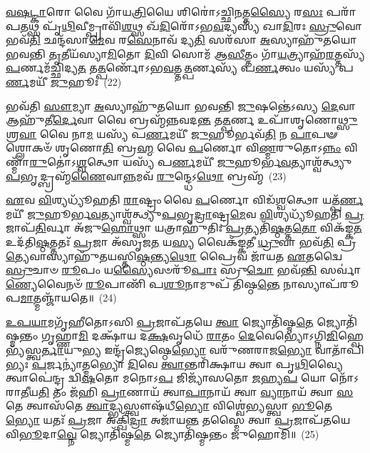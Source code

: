 \-\ul{𑌵}\-\-\ul{𑌷}\-\-\ul{𑌟𑍍𑌕𑌾}\-𑌰𑍋 𑌵𑍈 𑌗𑌾᳴𑌯\-\ul{𑌤𑍍𑌰𑌿}\-𑌯𑍈 𑌶𑌿𑌰𑍋॑\-𑌽𑌚𑍍𑌛𑌿\-\ul{𑌨}\-𑌤𑍍𑌤\-\ul{𑌸𑍍𑌯𑍈} 𑌰\-\ul{𑌸𑌃} 𑌪𑌰𑌾᳴𑌪\-\ul{𑌤}\-𑌥𑍍𑌸 𑌪𑍃᳴\-\ul{𑌥𑌿}\-𑌵𑍀𑌮𑍍𑌪𑍍𑌰𑌾𑌵𑌿᳴\-\ul{𑌶}\-𑌥𑍍𑌸 𑌖᳴\-\ul{𑌦𑌿}\-𑌰𑍋᳴\-𑌽𑌭\-\ul{𑌵}\-𑌦𑍍𑌯𑌸𑍍𑌯᳴ 𑌖𑌾\-\ul{𑌦𑌿}\-𑌰𑌃 \ul{𑌸𑍍𑌰𑍁}\-𑌵𑍋 𑌭𑌵᳴\-\ul{𑌤𑌿} 𑌛𑌨𑍍𑌦᳴𑌸𑌾\-\ul{𑌮𑍇}\-𑌵 𑌰\-\ul{𑌸𑍇}\-𑌨𑌾𑌵᳴ 𑌦𑍍𑌯\-\ul{𑌤𑌿} 𑌸𑌰᳴𑌸𑌾 \ul{𑌅}\-𑌸𑍍𑌯𑌾𑌹𑍁᳴𑌤𑌯𑍋 𑌭𑌵𑌨𑍍𑌤𑌿 \ul{𑌤𑍃}\-𑌤𑍀𑌯᳴𑌸𑍍𑌯𑌾\-\ul{𑌮𑌿}\-𑌤𑍋 \ul{𑌦𑌿}\-𑌵𑌿 𑌸𑍋𑌮᳴ 𑌆\-\ul{𑌸𑍀}\-𑌤𑍍𑌤𑌂 𑌗𑌾᳴\-\ul{𑌯}\-𑌤𑍍𑌰𑍍𑌯𑌾𑌹᳴\-\ul{𑌰}\-𑌤𑍍𑌤𑌸𑍍𑌯᳴ \ul{𑌪}\-𑌰𑍍𑌣𑌮᳴𑌚𑍍𑌛𑌿𑌦𑍍𑌯\-\ul{𑌤} 𑌤\-\ul{𑌤𑍍𑌪}\-𑌰𑍍𑌣𑍋᳴\-𑌽𑌭\-\ul{𑌵}\-𑌤𑍍𑌤\-\ul{𑌤𑍍𑌪}\-𑌰𑍍𑌣𑌸𑍍𑌯᳴ 𑌪\-\ul{𑌰𑍍𑌣}\-𑌤𑍍𑌵𑌂 𑌯𑌸𑍍𑌯᳴ 𑌪\-\ul{𑌰𑍍𑌣}\-𑌮𑌯𑍀᳴ \ul{𑌜𑍁}\-𑌹𑍂𑌃~(22)

𑌭𑌵᳴𑌤𑌿 \ul{𑌸𑍗}\-𑌮𑍍𑌯𑌾 \ul{𑌅}\-𑌸𑍍𑌯𑌾𑌹𑍁᳴𑌤𑌯𑍋 𑌭𑌵𑌨𑍍𑌤𑌿 \ul{𑌜𑍁}\-𑌷𑌨𑍍𑌤𑍇॑\-𑌽𑌸𑍍𑌯 \ul{𑌦𑍇}\-𑌵𑌾 𑌆𑌹𑍁᳴𑌤𑍀\-\ul{𑌰𑍍𑌦𑍇}\-𑌵𑌾 𑌵𑍈 𑌬𑍍𑌰𑌹𑍍𑌮᳴𑌨𑍍𑌨𑌵𑌦\-\ul{𑌨𑍍𑌤} 𑌤\-\ul{𑌤𑍍𑌪}\-𑌰𑍍𑌣 𑌉𑌪𑌾᳴𑌶𑍃𑌣𑍋\-\ul{𑌥𑍍𑌸𑍁}\-𑌶𑍍𑌰\-\ul{𑌵𑌾} 𑌵𑍈 𑌨𑌾\-\ul{𑌮} 𑌯𑌸𑍍𑌯᳴ 𑌪\-\ul{𑌰𑍍𑌣}\-𑌮𑌯𑍀᳴ \ul{𑌜𑍁}\-𑌹𑍂𑌰𑍍𑌭𑌵᳴\-\ul{𑌤𑌿} 𑌨 \ul{𑌪𑌾}\-𑌪𑍟 𑌶𑍍𑌲𑍋𑌕𑍞᳴ 𑌶𑍃𑌣𑍋\-\ul{𑌤𑌿} 𑌬𑍍𑌰\-\ul{𑌹𑍍𑌮} 𑌵𑍈 \ul{𑌪}\-𑌰𑍍𑌣𑍋 𑌵𑌿\-\ul{𑌣𑍍𑌮}\-𑌰𑍁𑌤𑍋\-𑌽\-\ul{𑌨𑍍𑌨𑌂} 𑌵𑌿𑌣𑍍𑌮𑌾᳴\-\ul{𑌰𑍁}\-𑌤𑍋॑\-𑌽\-\ul{𑌶𑍍𑌵}\-𑌤𑍍𑌥𑍋 𑌯𑌸𑍍𑌯᳴ 𑌪\-\ul{𑌰𑍍𑌣}\-𑌮𑌯𑍀᳴ \ul{𑌜𑍁}\-𑌹𑍂𑌰𑍍𑌭\-\ul{𑌵}\-𑌤𑍍𑌯𑌾𑌶𑍍𑌵᳴𑌤𑍍𑌥𑍍𑌯𑍁\-\ul{𑌪}\-𑌭𑍃𑌦𑍍𑌬𑍍𑌰𑌹𑍍𑌮᳴\-\ul{𑌣𑍈}\-𑌵𑌾\-\ul{𑌨𑍍𑌨}\-𑌮𑌵᳴ \ul{𑌰𑍁}\-𑌨𑍍𑌦𑍍𑌧𑍇\-𑌽\-\ul{𑌥𑍋} 𑌬𑍍𑌰𑌹𑍍𑌮᳴~(23)

\-\ul{𑌏}\-𑌵 \ul{𑌵𑌿}\-𑌶𑍍𑌯𑌧𑍍𑌯𑍂᳴𑌹𑌤𑌿 \ul{𑌰𑌾}\-𑌷𑍍𑌟𑍍𑌰𑌂 𑌵𑍈 \ul{𑌪}\-𑌰𑍍𑌣𑍋 𑌵𑌿𑌡᳴\-\ul{𑌶𑍍𑌵}\-𑌤𑍍𑌥𑍋 𑌯𑌤𑍍𑌪᳴\-\ul{𑌰𑍍𑌣}\-𑌮𑌯𑍀᳴ \ul{𑌜𑍁}\-𑌹𑍂𑌰𑍍𑌭\-\ul{𑌵}\-𑌤𑍍𑌯𑌾𑌶𑍍𑌵᳴𑌤𑍍𑌥𑍍𑌯𑍁\-\ul{𑌪}\-𑌭𑍃\-\ul{𑌦𑍍𑌰𑌾}\-𑌷𑍍𑌟𑍍𑌰\-\ul{𑌮𑍇}\-𑌵 \ul{𑌵𑌿}\-𑌶𑍍𑌯𑌧𑍍𑌯𑍂᳴𑌹𑌤𑌿 \ul{𑌪𑍍𑌰}\-𑌜𑌾𑌪᳴\-\ul{𑌤𑌿}\-𑌰𑍍𑌵𑌾 𑌅᳴𑌜𑍁\-\ul{𑌹𑍋}\-𑌥𑍍𑌸𑌾 𑌯𑌤𑍍𑌰𑌾𑌹𑍁᳴𑌤𑌿𑌃 \ul{𑌪𑍍𑌰}\-𑌤𑍍𑌯𑌤𑌿᳴\-\ul{𑌷𑍍𑌠}\-𑌤𑍍𑌤\-\ul{𑌤𑍋} 𑌵𑌿𑌕᳴𑌙𑍍𑌕\-\ul{𑌤} 𑌉𑌦᳴𑌤𑌿\-\ul{𑌷𑍍𑌠}\-𑌤𑍍𑌤𑌤𑌃᳴ \ul{𑌪𑍍𑌰}\-𑌜𑌾 𑌅᳴𑌸𑍃𑌜\-\ul{𑌤} 𑌯\-\ul{𑌸𑍍𑌯} 𑌵𑍈𑌕᳴𑌙𑍍𑌕𑌤𑍀 \ul{𑌧𑍍𑌰𑍁}\-𑌵𑌾 𑌭𑌵᳴\-\ul{𑌤𑌿} 𑌪𑍍𑌰\-\ul{𑌤𑍍𑌯𑍇}\-𑌵𑌾𑌸𑍍𑌯𑌾𑌹𑍁᳴𑌤𑌯𑌸𑍍𑌤𑌿\-\ul{𑌷𑍍𑌠}\-𑌨𑍍𑌤𑍍𑌯\-\ul{𑌥𑍋} 𑌪𑍍𑌰𑍈𑌵 𑌜𑌾᳴𑌯𑌤 \ul{𑌏}\-𑌤𑌦𑍍𑌵𑍈 \ul{𑌸𑍍𑌰𑍁}\-𑌚𑌾𑍞 \ul{𑌰𑍂}\-𑌪𑌂 𑌯\-\ul{𑌸𑍍𑌯𑍈}\-𑌵𑍞𑌰𑍂᳴\-\ul{𑌪𑌾𑌃} 𑌸𑍍𑌰𑍁\-\ul{𑌚𑍋} 𑌭𑌵᳴\-\ul{𑌨𑍍𑌤𑌿} 𑌸𑌰𑍍𑌵𑌾॑\-\ul{𑌣𑍍𑌯𑍇}\-𑌵𑍈𑌨𑍞᳴ \ul{𑌰𑍂}\-𑌪𑌾𑌣𑌿᳴ 𑌪\-\ul{𑌶𑍂}\-𑌨𑌾𑌮𑍁𑌪᳴ 𑌤𑌿𑌷𑍍𑌠\-\ul{𑌨𑍍𑌤𑍇} 𑌨𑌾𑌸𑍍𑌯𑌾𑌪᳴𑌰𑍂𑌪\-\ul{𑌮𑌾}\-𑌤𑍍𑌮𑌞𑍍𑌜𑌾᳴𑌯𑌤𑍇॥~(24)

{\anuvakamend[{\-\ul{𑌜𑍁}\-𑌹𑍂𑌰\-\ul{𑌥𑍋} 𑌬𑍍𑌰𑌹𑍍𑌮᳴ \ul{𑌸𑍍𑌰𑍁}\-𑌚𑌾𑍞 \ul{𑌸}\-𑌪𑍍𑌤𑌦᳴𑌶 𑌚}]}%

\-\ul{𑌉}\-\-\ul{𑌪}\-\-\ul{𑌯𑌾}\-𑌮𑌗𑍃᳴𑌹𑍀𑌤𑍋\-𑌽𑌸𑌿 \ul{𑌪𑍍𑌰}\-𑌜𑌾𑌪᳴𑌤𑌯𑍇 \ul{𑌤𑍍𑌵𑌾} 𑌜𑍍𑌯𑍋𑌤𑌿᳴𑌷𑍍𑌮\-\ul{𑌤𑍇} 𑌜𑍍𑌯𑍋𑌤𑌿᳴𑌷𑍍𑌮𑌨𑍍𑌤𑌂 𑌗𑍃𑌹𑍍𑌣𑌾\-\ul{𑌮𑌿} 𑌦𑌕𑍍𑌷𑌾᳴𑌯 𑌦\-\ul{𑌕𑍍𑌷}\-𑌵𑍃𑌧𑍇᳴ \ul{𑌰𑌾}\-𑌤𑌂 \ul{𑌦𑍇}\-𑌵𑍇𑌭𑍍𑌯𑍋॑\-𑌽𑌗𑍍𑌨𑌿\-\ul{𑌜𑌿}\-𑌹𑍍𑌵𑍇𑌭𑍍𑌯᳴\-𑌸𑍍𑌤𑍍𑌵\-\ul{𑌰𑍍𑌤𑌾}\-𑌯𑍁\-\ul{𑌭𑍍𑌯} 𑌇𑌨𑍍𑌦𑍍𑌰᳴𑌜𑍍𑌯𑍇𑌷𑍍𑌠𑍇\-\ul{𑌭𑍍𑌯𑍋} 𑌵𑌰𑍁᳴𑌣𑌰𑌾𑌜\-\ul{𑌭𑍍𑌯𑍋} 𑌵𑌾𑌤𑌾᳴𑌪𑌿𑌭𑍍𑌯𑌃 \ul{𑌪}\-𑌰𑍍𑌜𑌨𑍍𑌯𑌾॑𑌤𑍍𑌮𑌭𑍍𑌯𑍋 \ul{𑌦𑌿}\-𑌵𑍇 \ul{𑌤𑍍𑌵𑌾}\-𑌨𑍍𑌤𑌰𑌿᳴𑌕𑍍𑌷𑌾𑌯 𑌤𑍍𑌵𑌾 𑌪𑍃\-\ul{𑌥𑌿}\-𑌵𑍍𑌯𑍈 𑌤𑍍𑌵𑌾𑌪𑍇॑𑌨𑍍𑌦𑍍𑌰 𑌦𑍍𑌵𑌿\-\ul{𑌷}\-𑌤𑍋 𑌮𑌨𑍋\-𑌽\-\ul{𑌪} 𑌜𑌿𑌜𑍍𑌯𑌾᳴𑌸𑌤𑍋 \ul{𑌜}\-𑌹𑍍𑌯\-\ul{𑌪} 𑌯𑍋 𑌨𑍋᳴\-𑌽𑌰𑌾\-\ul{𑌤𑍀}\-𑌯\-\ul{𑌤𑌿} 𑌤𑌂 𑌜᳴𑌹𑌿 \ul{𑌪𑍍𑌰𑌾}\-𑌣𑌾𑌯᳴ 𑌤𑍍𑌵𑌾\-\ul{𑌪𑌾}\-𑌨𑌾𑌯᳴ 𑌤𑍍𑌵𑌾 \ul{𑌵𑍍𑌯𑌾}\-𑌨𑌾𑌯᳴ 𑌤𑍍𑌵𑌾 \ul{𑌸}\-𑌤𑍇 𑌤𑍍𑌵𑌾𑌸᳴𑌤𑍇 \ul{𑌤𑍍𑌵𑌾}\-𑌦𑍍𑌭𑍍𑌯𑌸𑍍𑌤𑍍𑌵𑍗𑌷᳴𑌧𑍀\-\ul{𑌭𑍍𑌯𑍋} 𑌵𑌿𑌶𑍍𑌵𑍇॑𑌭𑍍𑌯𑌸𑍍𑌤𑍍𑌵𑌾 \ul{𑌭𑍂}\-𑌤𑍇\-\ul{𑌭𑍍𑌯𑍋} 𑌯𑌤𑌃᳴ \ul{𑌪𑍍𑌰}\-𑌜𑌾 𑌅𑌕𑍍𑌖𑌿᳴\-\ul{𑌦𑍍𑌰𑌾} 𑌅𑌜𑌾᳴𑌯\-\ul{𑌨𑍍𑌤} 𑌤𑌸𑍍𑌮𑍈॑ 𑌤𑍍𑌵𑌾 \ul{𑌪𑍍𑌰}\-𑌜𑌾𑌪᳴𑌤𑌯𑍇 𑌵𑌿\-\ul{𑌭𑍂}\-𑌦𑌾\-\ul{𑌵𑍍𑌨𑍇} 𑌜𑍍𑌯𑍋𑌤𑌿᳴𑌷𑍍𑌮\-\ul{𑌤𑍇} 𑌜𑍍𑌯𑍋𑌤𑌿᳴𑌷𑍍𑌮𑌨𑍍𑌤𑌂 𑌜𑍁𑌹𑍋𑌮𑌿॥~(25)

